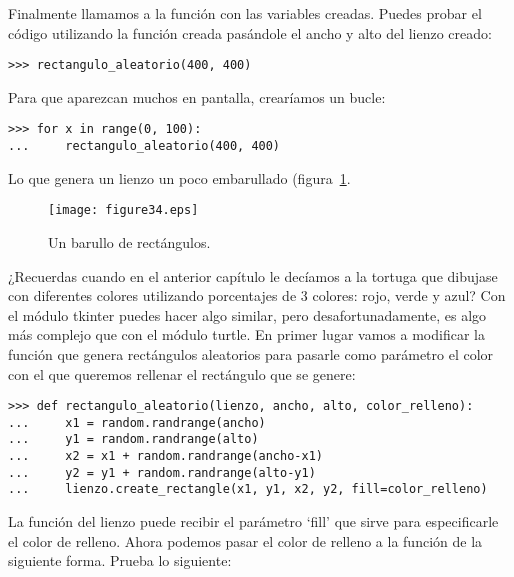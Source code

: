Finalmente llamamos a la función  con las variables creadas.  Puedes probar el código utilizando la función creada pasándole el ancho y alto del lienzo creado:

\begin{listing}
\begin{verbatim}
>>> rectangulo_aleatorio(400, 400)
\end{verbatim}
\end{listing}

\noindent
Para que aparezcan muchos en pantalla, crearíamos un bucle:

\begin{listing}
\begin{verbatim}
>>> for x in range(0, 100):
...     rectangulo_aleatorio(400, 400)
\end{verbatim}
\end{listing}

\noindent
Lo que genera un lienzo un poco embarullado (figura~\ref{fig34}.

\begin{figure}
\begin{center}
\texttt{[image: figure34.eps]}
\end{center}
\caption{Un barullo de rectángulos.}\label{fig34}
\end{figure}

¿Recuerdas cuando en el anterior capítulo le decíamos a la tortuga que dibujase con diferentes colores utilizando porcentajes de 3 colores: rojo, verde y azul? Con el módulo tkinter puedes hacer algo similar, pero desafortunadamente, es algo más complejo que con el módulo turtle.  En primer lugar vamos a modificar la función que genera rectángulos aleatorios para pasarle como parámetro el color con el que queremos rellenar el rectángulo que se genere:

\begin{listing}
\begin{verbatim}
>>> def rectangulo_aleatorio(lienzo, ancho, alto, color_relleno):
...     x1 = random.randrange(ancho)
...     y1 = random.randrange(alto)
...     x2 = x1 + random.randrange(ancho-x1)
...     y2 = y1 + random.randrange(alto-y1)
...     lienzo.create_rectangle(x1, y1, x2, y2, fill=color_relleno)
\end{verbatim}
\end{listing}

La función  del lienzo puede recibir el parámetro `fill' que sirve para especificarle el color de relleno.  Ahora podemos pasar el color de relleno a la función de la siguiente forma. Prueba lo siguiente:

